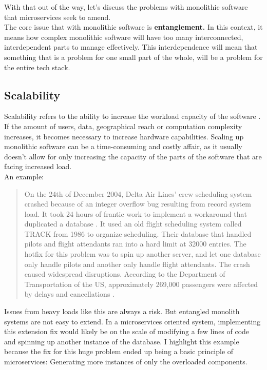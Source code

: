 With that out of the way, let's discuss the problems with monolithic software that microservices seek to amend.\\
The core issue that with monolithic software is \textbf{entanglement.}
In this context, it means how complex monolithic software will have too many interconnected, interdependent parts to manage effectively.
This interdependence will mean that something that is a problem for one small part of the whole, will be a problem for the entire tech stack. 

\subsection{Scalability} 
Scalability refers to the ability to increase the workload capacity of the software \cite*{Scalability}. 
If the amount of users, data, geographical reach or computation complexity increases, it becomes necessary to increase hardware capabilities. 
Scaling up monolithic software can be a time-consuming and costly affair, as it usually doesn't allow for only increasing the capacity of the parts of the software that are facing increased load.  \\
An example: 
\begin{quote} 
 On the 24th of December 2004, Delta Air Lines' crew scheduling system crashed because of an integer overflow bug resulting from record system load. 
 It took 24 hours of frantic work to implement a workaround that duplicated a database \cite*{USAToday}. 
It used an old flight scheduling system called TRACK from 1986 to organize scheduling. 
Their database that handled pilots and flight attendants ran into a hard limit at 32000 entries.
The hotfix for this problem was to spin up another server, and let one database only handle pilots and another only handle flight attendants. 
The crash caused widespread disruptions. According to the Department of Transportation of the US, approximately 269,000 passengers were affected by delays and cancellations \cite*{DOT}. 
\end{quote}
Issues from heavy loads like this are always a risk. But entangled monolith systems are not easy to extend. 
In a microservices oriented system, implementing this extension fix would likely be on the scale of modifying a few lines of code and spinning up another instance of the database. 
I highlight this example because the fix for this huge problem ended up being a basic principle of microservices: Generating more instances of only the overloaded components. 
\\
